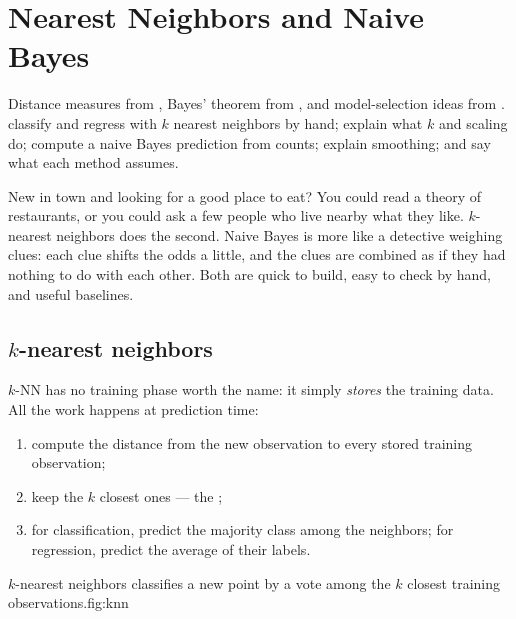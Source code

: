 \chapter{Nearest Neighbors and Naive Bayes}
\label{ch:knn-nb}

\chapterguide%
  {Distance measures from , Bayes' theorem from , and model-selection ideas from .}
  {classify and regress with $k$ nearest neighbors by hand; explain what $k$ and scaling do; compute a naive Bayes prediction from counts; explain smoothing; and say what each method assumes.}

New in town and looking for a good place to eat? You could read a theory of restaurants, or you could ask a few people who live nearby what they like. $k$-nearest neighbors does the second. Naive Bayes is more like a detective weighing clues: each clue shifts the odds a little, and the clues are combined as if they had nothing to do with each other. Both are quick to build, easy to check by hand, and useful baselines.

\section{$k$-nearest neighbors}
\label{sec:knn}

$k$-NN has no training phase worth the name: it simply \emph{stores} the training data. All the work happens at prediction time:

\begin{enumerate}
  \item compute the distance from the new observation to every stored training observation;
  \item keep the $k$ closest ones --- the ;
  \item for classification, predict the majority class among the neighbors; for regression, predict the average of their labels.
\end{enumerate}

\begin{utpfig}{$k$-nearest neighbors classifies a new point by a vote among the $k$ closest training observations.}{fig:knn}
\end{utpfig}

